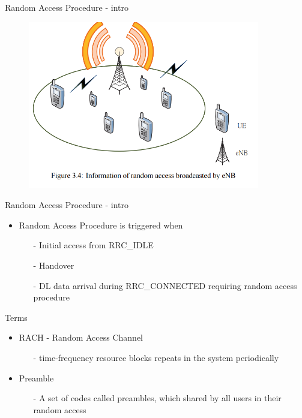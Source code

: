 \documentclass{beamer}
\begin{document}
\begin{frame}{Random Access Procedure - intro}
    \begin{figure}[t]
        \centering
        \includegraphics[width=0.9\textwidth]{figures/envir.png}
    \end{figure}
\end{frame}

\begin{frame}{Random Access Procedure - intro}
    \begin{itemize}
        \item{Random Access Procedure is triggered when}
        \begin{itemize}    
            \item[-]{Initial access from RRC\_IDLE}
            \item[-]{Handover}
            \item[-]{DL data arrival during RRC\_CONNECTED requiring random access procedure}
        \end{itemize}
    \end{itemize}
\end{frame}

\begin{frame}{Terms}
    \begin{itemize}
        \item{RACH - Random Access Channel}
        \begin{itemize}    
            \item[-]{time-frequency resource blocks repeats in the system periodically}
        \end{itemize}
        \item{Preamble}
        \begin{itemize}    
            \item[-]{A set of codes called preambles, which shared by all users in their random access}
        \end{itemize}
    \end{itemize}
\end{frame}
\end{document}
